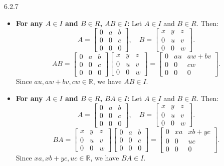 \documentclass[12pt]{amsart}
\theoremstyle{definition}
\numberwithin{equation}{section}
\newcommand{\R}{\mathbb{R}}
\begin{document}
\begin{exercise}{6.2.7}
    \begin{itemize}
        \item \textbf{For any \(A \in I\) and \(B \in R\), \(AB \in I\):}
        Let \(A \in I\) and \(B \in R\). Then:
        \[
        A = \begin{bmatrix} 0 & a & b \\ 0 & 0 & c \\ 0 & 0 & 0 \end{bmatrix}, \quad B = \begin{bmatrix} x & y & z \\ 0 & u & v \\ 0 & 0 & w \end{bmatrix}.
        \]
        \[
        AB = \begin{bmatrix} 0 & a & b \\ 0 & 0 & c \\ 0 & 0 & 0 \end{bmatrix} \begin{bmatrix} x & y & z \\ 0 & u & v \\ 0 & 0 & w \end{bmatrix} = \begin{bmatrix} 0 & au & aw + bv \\ 0 & 0 & cw \\ 0 & 0 & 0 \end{bmatrix}.
        \]
        Since \(au, aw + bv, cw \in \R \), we have \(AB \in I\).

        \item \textbf{For any \(A \in I\) and \(B \in R\), \(BA \in I\):}
        Let \(A \in I\) and \(B \in R\). Then:
        \[
        A = \begin{bmatrix} 0 & a & b \\ 0 & 0 & c \\ 0 & 0 & 0 \end{bmatrix}, \quad B = \begin{bmatrix} x & y & z \\ 0 & u & v \\ 0 & 0 & w \end{bmatrix}.
        \]
        \[
        BA = \begin{bmatrix} x & y & z \\ 0 & u & v \\ 0 & 0 & w \end{bmatrix} \begin{bmatrix} 0 & a & b \\ 0 & 0 & c \\ 0 & 0 & 0 \end{bmatrix} = \begin{bmatrix} 0 & xa & xb + yc \\ 0 & 0 & uc \\ 0 & 0 & 0 \end{bmatrix}.
        \]
        Since \(xa, xb + yc, uc \in \R \), we have \(BA \in I\).
    \end{itemize}


\end{exercise}
\end{document}
